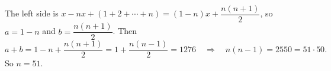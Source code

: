 The left side is $x-nx+(1+2+\cdots+n)=(1-n)x+\dfrac{n(n+1)}{2}$, so $a=1-n$ and $b=\dfrac{n(n+1)}{2}$. Then
\[
a+b=1-n+\dfrac{n(n+1)}{2}=1+\dfrac{n(n-1)}{2}=1276\quad\Longrightarrow\quad n(n-1)=2550=51\cdot50 .
\]
So $n=\boxed{51}$.
